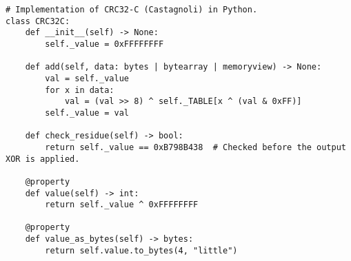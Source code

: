 \begin{samepage}
\begin{verbatim}
# Implementation of CRC32-C (Castagnoli) in Python.
class CRC32C:
    def __init__(self) -> None:
        self._value = 0xFFFFFFFF

    def add(self, data: bytes | bytearray | memoryview) -> None:
        val = self._value
        for x in data:
            val = (val >> 8) ^ self._TABLE[x ^ (val & 0xFF)]
        self._value = val

    def check_residue(self) -> bool:
        return self._value == 0xB798B438  # Checked before the output XOR is applied.

    @property
    def value(self) -> int:
        return self._value ^ 0xFFFFFFFF

    @property
    def value_as_bytes(self) -> bytes:
        return self.value.to_bytes(4, "little")


\end{verbatim}
\end{samepage}
